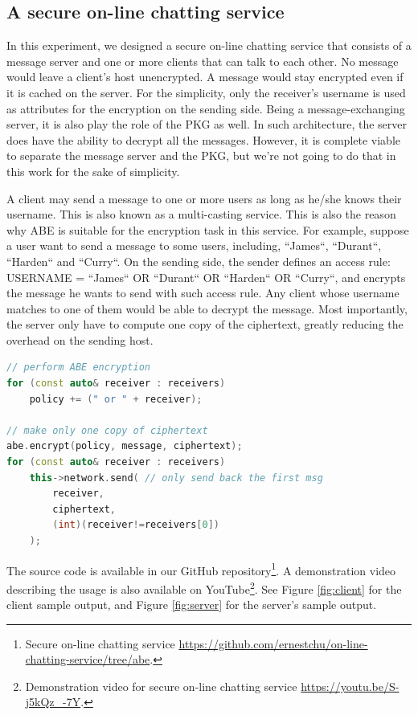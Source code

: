 \documentclass[12pt]{article}
\begin{document}
\subsection{A secure on-line chatting service}
In this experiment, we designed a secure on-line chatting service that consists of a message server and one or more clients that can talk to each other. No message would leave a client's host unencrypted. A message would stay encrypted even if it is cached on the server. For the simplicity, only the receiver's username is used as attributes for the encryption on the sending side. Being a message-exchanging server, it is also play the role of the PKG as well. In such architecture, the server does have the ability to decrypt all the messages. However, it is complete viable to separate the message server and the PKG, but we're not going to do that in this work for the sake of simplicity.

A client may send a message to one or more users as long as he/she knows their username. This is also known as a multi-casting service. This is also the reason why ABE is suitable for the encryption task in this service. For example, suppose a user want to send a message to some users, including, “James“, “Durant“, “Harden“ and “Curry“. On the sending side, the sender defines an access rule: USERNAME = “James“ OR “Durant“ OR “Harden“ OR “Curry“, and encrypts the message he wants to send with such access rule. Any client whose username matches to one of them would be able to decrypt the message. Most importantly, the server only have to compute one copy of the ciphertext, greatly reducing the overhead on the sending host.

\begin{lstlisting}[language=c++]
// perform ABE encryption
for (const auto& receiver : receivers)
    policy += (" or " + receiver);

// make only one copy of ciphertext
abe.encrypt(policy, message, ciphertext);
for (const auto& receiver : receivers)
    this->network.send( // only send back the first msg
        receiver,
        ciphertext,
        (int)(receiver!=receivers[0])
    );
\end{lstlisting}

The source code is available in our GitHub repository\footnote{Secure on-line chatting service \url{https://github.com/ernestchu/on-line-chatting-service/tree/abe}.}. A demonstration video describing the usage is also available on YouTube\footnote{Demonstration video for secure on-line chatting service \url{https://youtu.be/S-j5kQz_-7Y}.}. See Figure \ref{fig:client} for the client sample output, and Figure \ref{fig:server} for the server's sample output.
\end{document}
